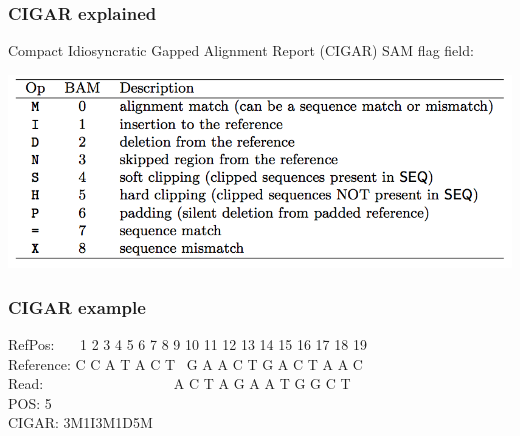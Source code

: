 \documentclass[pdf]{beamer}
\begin{document}
\begin{frame}[allowframebreaks]
\frametitle{CIGAR explained}
Compact Idiosyncratic Gapped Alignment Report (CIGAR)
\vspace{0.1in}
SAM flag field:
\begin{center}
\includegraphics[scale=0.4]{Figures/Sam-Cigar.png} 
\end{center}
\end{frame}

\begin{frame}
\frametitle{CIGAR example}
RefPos: \ \ \ 1  2  3  4  5  6  7     8  9 10 11 12 13 14 15 16 17 18 19\\
Reference:  C  C  A  T  A  C  T  \   G  A  A  C  T  G  A  C  T  A  A  C\\
Read: \ \ \ \ \ \ \ \ \ \ \ \ \ \ \ \ \ \ A  C  T  A  G  A  A     T  G  G  C  T\\
\vspace{0.2in}
POS: 5\\
CIGAR: 3M1I3M1D5M\\
\end{frame}
\end{document}
